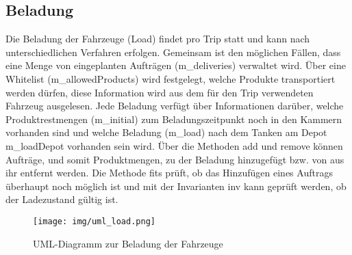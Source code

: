 \subsection{Beladung}\label{chp:load}
Die Beladung der Fahrzeuge (\textsf{Load}) findet pro Trip statt und kann nach unterschiedlichen Verfahren erfolgen. Gemeinsam ist den möglichen Fällen, dass eine Menge von eingeplanten Aufträgen (\textsf{m\_deliveries}) verwaltet wird. Über eine Whitelist (\textsf{m\_allowed\-Products}) wird festgelegt, welche Produkte transportiert werden dürfen, diese Information wird aus dem für den Trip verwendeten Fahrzeug ausgelesen. Jede Beladung verfügt über Informationen darüber, welche Produktrestmengen (\textsf{m\_initial}) zum Beladungszeitpunkt noch in den Kammern vorhanden sind und welche Beladung (\textsf{m\_load}) nach dem Tanken am Depot \textsf{m\_loadDepot} vorhanden sein wird. Über die Methoden \textsf{add} und \textsf{remove} können Aufträge, und somit Produktmengen, zu der Beladung hinzugefügt bzw. von aus ihr entfernt werden. Die Methode \textsf{fits} prüft, ob das Hinzufügen eines Auftrags überhaupt noch möglich ist und mit der Invarianten \textsf{inv} kann geprüft werden, ob der Ladezustand gültig ist. \\

\begin{figure}[h]
  \centering
  \texttt{[image: img/uml\_load.png]}
  \caption{UML-Diagramm zur Beladung der Fahrzeuge}
  \label{fig:uml_load}
\end{figure}

